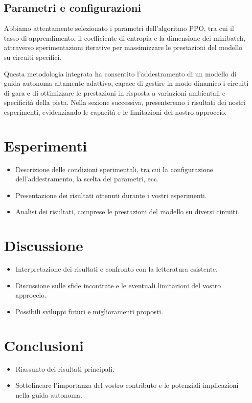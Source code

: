 \documentclass[conference]{IEEEtran}
\begin{document}
\subsection{Parametri e configurazioni}
Abbiamo attentamente selezionato i parametri dell'algoritmo PPO, tra cui il tasso di apprendimento, il coefficiente di entropia e la dimensione dei minibatch, attraverso sperimentazioni iterative per massimizzare le prestazioni del modello su circuiti specifici.

\medskip

Questa metodologia integrata ha consentito l'addestramento di un modello di guida autonoma altamente adattivo, capace di gestire in modo dinamico i circuiti di gara e di ottimizzare le prestazioni in risposta a variazioni ambientali e specificità della pista. Nella sezione successiva, presenteremo i risultati dei nostri esperimenti, evidenziando le capacità e le limitazioni del nostro approccio.


\section{Esperimenti}

\begin{itemize}
    \item Descrizione delle condizioni sperimentali, tra cui la configurazione dell'addestramento, la scelta dei parametri, ecc.

    \item Presentazione dei risultati ottenuti durante i vostri esperimenti.

    \item Analisi dei risultati, comprese le prestazioni del modello su diversi circuiti.

\end{itemize}

\section{Discussione}

\begin{itemize}
    \item Interpretazione dei risultati e confronto con la letteratura esistente.

    \item Discussione sulle sfide incontrate e le eventuali limitazioni del vostro approccio.

    \item Possibili sviluppi futuri e miglioramenti proposti.

\end{itemize}

\section{Conclusioni}

\begin{itemize}
    \item Riassunto dei risultati principali.

    \item Sottolineare l'importanza del vostro contributo e le potenziali implicazioni nella guida autonoma.

\end{itemize}



\end{document}
